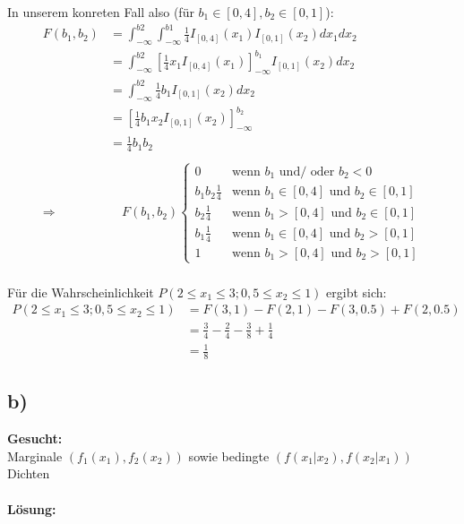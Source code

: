 \documentclass{article}
\begin{document}
In unserem konreten Fall also (für $b_{1} \in [0,4], b_{2} \in [0,1] $):
\begin{align*}
    F(b_{1}, b_{2}) &= \int_{-\infty}^{b2}\int_{-\infty}^{b1}\frac{1}{4}I_{[0,4]}(x_{1})I_{[0,1]}(x_{2})dx_{1}dx_{2} \\
    &= \int_{-\infty}^{b2}[\frac{1}{4}x_{1}I_{[0,4]}(x_{1})]^{b_{1}}_{-\infty}I_{[0,1]}(x_{2})dx_{2} \\
    &= \int_{-\infty}^{b2}\frac{1}{4}b_{1}I_{[0,1]}(x_{2})dx_{2} \\
    &= [\frac{1}{4}b_{1}x_{2}I_{[0,1]}(x_{2})]^{b_{2}}_{-\infty} \\
    &= \frac{1}{4}b_{1}b_{2} \\ \\
    \Longrightarrow& \quad F(b_{1}, b_{2})
    \begin{cases}
        0 & \text{wenn } b_{1} \text{ und/ oder } b_{2} < 0 \\
        b_{1}b_{2}\frac{1}{4} &\text{wenn } b_{1} \in [0, 4] \text{ und } b_{2} \in [0, 1] \\
        b_{2}\frac{1}{4} &\text{wenn } b_{1} > [0, 4] \text{ und } b_{2} \in [0, 1] \\
        b_{1}\frac{1}{4} &\text{wenn } b_{1} \in [0, 4] \text{ und } b_{2} > [0, 1] \\
        1 &\text{wenn } b_{1} > [0, 4] \text{ und } b_{2} > [0, 1] 
    \end{cases}
\end{align*} \\

Für die Wahrscheinlichkeit $P(2 \leq x_{1} \leq 3; 0,5\leq x_{2}\leq 1)$ ergibt sich:
\begin{align*}
    P(2 \leq x_{1} \leq 3; 0,5\leq x_{2}\leq 1) &= F(3, 1) - F (2, 1) - F(3, 0.5) + F(2, 0.5) \\
    &= \frac{3}{4} - \frac{2}{4} - \frac{3}{8} + \frac{1}{4} \\
    &=\frac{1}{8} 
\end{align*}
\subsection*{b)}
\textbf{Gesucht:} \\

Marginale $(f_{1}(x_{1}), f_{2}(x_{2}))$ sowie bedingte $(f(x_{1}|x_{2}), f(x_{2}|x_{1}))$ Dichten \\ \\
\textbf{Lösung:} \\
\end{document}
